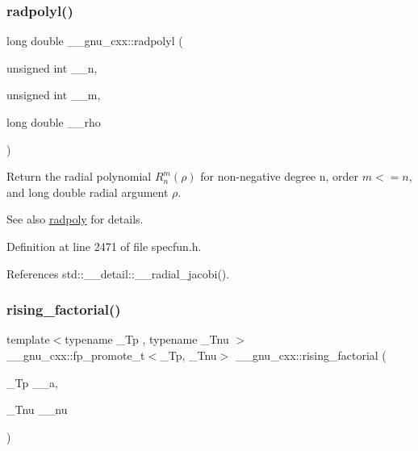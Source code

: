 \mbox{\label{group__mathsf__gnu_ga377febebd1096400897170bb7a76cd3a}} 
\subsubsection{\texorpdfstring{radpolyl()}{radpolyl()}}
{\footnotesize\ttfamily long double \+\_\+\+\_\+gnu\+\_\+cxx\+::radpolyl (\begin{DoxyParamCaption}\item[{unsigned int}]{\+\_\+\+\_\+n,  }\item[{unsigned int}]{\+\_\+\+\_\+m,  }\item[{long double}]{\+\_\+\+\_\+rho }\end{DoxyParamCaption})\hspace{0.3cm}{\ttfamily [inline]}}

Return the radial polynomial $ R_n^m(\rho) $ for non-\/negative degree {\ttfamily n}, order $ m <= n $, and {\ttfamily long double} radial argument $ \rho $.

\begin{DoxySeeAlso}{See also}
\hyperlink{group__mathsf__gnu_ga195db2592888b7a8df870d9eaeff8d05}{radpoly} for details. 
\end{DoxySeeAlso}


Definition at line 2471 of file specfun.\+h.



References std\+::\+\_\+\+\_\+detail\+::\+\_\+\+\_\+radial\+\_\+jacobi().

\mbox{\label{group__mathsf__gnu_gae8c36a0e1f60254cf212a3806f7c675c}} 
\subsubsection{\texorpdfstring{rising\+\_\+factorial()}{rising\_factorial()}}
{\footnotesize\ttfamily template$<$typename \+\_\+\+Tp , typename \+\_\+\+Tnu $>$ \\
\+\_\+\+\_\+gnu\+\_\+cxx\+::fp\+\_\+promote\+\_\+t$<$\+\_\+\+Tp, \+\_\+\+Tnu$>$ \+\_\+\+\_\+gnu\+\_\+cxx\+::rising\+\_\+factorial (\begin{DoxyParamCaption}\item[{\+\_\+\+Tp}]{\+\_\+\+\_\+a,  }\item[{\+\_\+\+Tnu}]{\+\_\+\+\_\+nu }\end{DoxyParamCaption})\hspace{0.3cm}{\ttfamily [inline]}}



